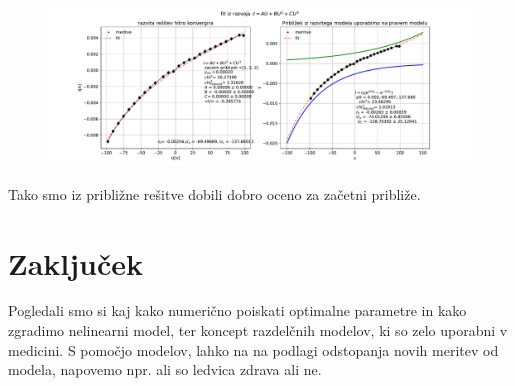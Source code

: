 \documentclass[11pt, a4paper]{article}
\begin{document}
 \begin{figure}[H]
\hspace*{-3.5cm}     
  \includegraphics[width=24cm] {tretja_razvoj_fit.pdf}
 
 \end{figure}
Tako smo iz približne rešitve dobili dobro oceno za začetni približe.
\section{Zaključek}
Pogledali smo si kaj kako numerično poiskati optimalne parametre in kako zgradimo nelinearni model, ter koncept razdelčnih modelov, ki so zelo uporabni v medicini. S pomočjo modelov, lahko na na podlagi odstopanja novih meritev od modela, napovemo npr. ali so ledvica zdrava ali ne.
\end{document}
